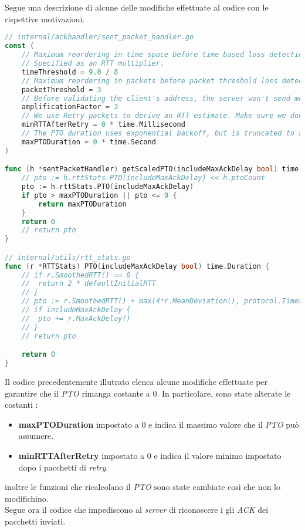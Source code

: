 \\\\
Segue una descrizione di alcune delle modifiche effettuate al codice con le rispettive motivazioni.
\begin{lstlisting}[language=Go]
// internal/ackhandler/sent_packet_handler.go
const (
	// Maximum reordering in time space before time based loss detection considers a packet lost.
	// Specified as an RTT multiplier.
	timeThreshold = 9.0 / 8
	// Maximum reordering in packets before packet threshold loss detection considers a packet lost.
	packetThreshold = 3
	// Before validating the client's address, the server won't send more than 3x bytes than it received.
	amplificationFactor = 3
	// We use Retry packets to derive an RTT estimate. Make sure we don't set the RTT to a super low value yet.
	minRTTAfterRetry = 0 * time.Millisecond 
	// The PTO duration uses exponential backoff, but is truncated to a maximum value, as allowed by RFC 8961, section 4.4.
	maxPTODuration = 0 * time.Second 
)

func (h *sentPacketHandler) getScaledPTO(includeMaxAckDelay bool) time.Duration {
	// pto := h.rttStats.PTO(includeMaxAckDelay) << h.ptoCount
	pto := h.rttStats.PTO(includeMaxAckDelay)
	if pto > maxPTODuration || pto <= 0 {
		return maxPTODuration
	}
	return 0
	// return pto
}

// internal/utils/rtt_stats.go
func (r *RTTStats) PTO(includeMaxAckDelay bool) time.Duration {
	// if r.SmoothedRTT() == 0 {
	// 	return 2 * defaultInitialRTT
	// }
	// pto := r.SmoothedRTT() + max(4*r.MeanDeviation(), protocol.TimerGranularity)
	// if includeMaxAckDelay {
	// 	pto += r.MaxAckDelay()
	// }
	// return pto

	return 0
}
\end{lstlisting}
\noindent Il codice precedentemente illutrato elenca alcune modifiche effettuate per garantire che il \emph{PTO} rimanga costante a 0. 
In particolare, sono state alterate le costanti : 
\begin{itemize}
    \item \textbf{maxPTODuration} impostato a 0 e indica il massimo valore che il \emph{PTO} può assumere. 
    \item \textbf{minRTTAfterRetry} impostato a 0 e indica il valore minimo impostato dopo i pacchetti di \emph{retry}.
\end{itemize}
\noindent inoltre le funzioni che ricalcolano il \emph{PTO} sono state cambiate così che non lo modifichino.
\\
Segue ora il codice che impediscono al \emph{server} di riconoscere i gli \emph{ACK} dei pacchetti inviati. 
